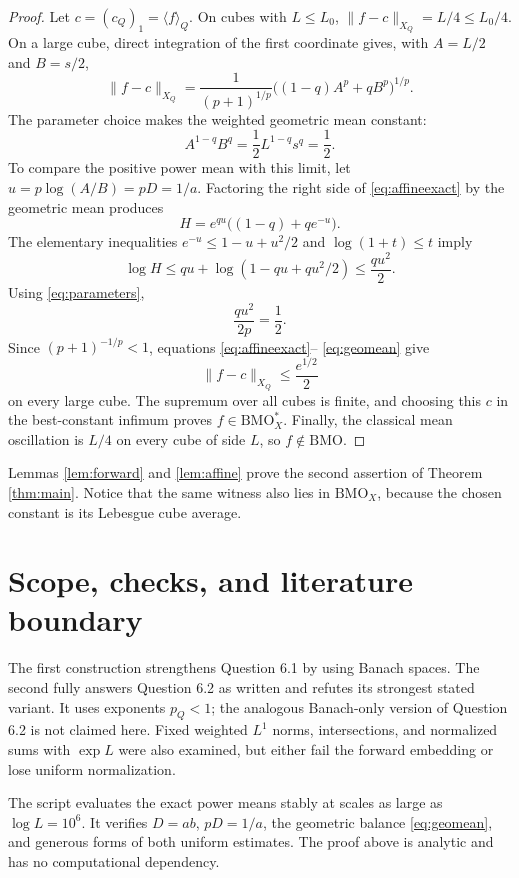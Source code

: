 \documentclass[10pt]{article}
\newcommand{\BMO}{\mathrm{BMO}}
\newcommand{\avg}[1]{\langle #1\rangle}
\begin{document}
\begin{proof}
Let $c=(c_Q)_1=\avg f_Q$.  On cubes with $L\le L_0$,
\(\|f-c\|_{X_Q}=L/4\le L_0/4\).  On a large cube, direct integration of the
first coordinate gives, with $A=L/2$ and $B=s/2$,
\begin{equation}\label{eq:affineexact}
 \|f-c\|_{X_Q}
 =\frac1{(p+1)^{1/p}}
   \bigl((1-q)A^p+qB^p\bigr)^{1/p}.
\end{equation}
The parameter choice makes the weighted geometric mean constant:
\begin{equation}\label{eq:geomean}
 A^{1-q}B^q=\frac12L^{1-q}s^q=\frac12.
\end{equation}
To compare the positive power mean with this limit, let
\(u=p\log(A/B)=pD=1/a\).  Factoring the right side of
\eqref{eq:affineexact} by the geometric mean produces
\[
 H=e^{qu}\bigl((1-q)+qe^{-u}\bigr).
\]
The elementary inequalities $e^{-u}\le1-u+u^2/2$ and
\(\log(1+t)\le t\) imply
\[
 \log H
 \le qu+\log(1-qu+qu^2/2)
 \le\frac{qu^2}{2}.
\]
Using \eqref{eq:parameters},
\[
 \frac{qu^2}{2p}=\frac12.
\]
Since $(p+1)^{-1/p}<1$, equations \eqref{eq:affineexact}--
\eqref{eq:geomean} give
\[
 \|f-c\|_{X_Q}\le\frac{e^{1/2}}2
\]
on every large cube.  The supremum over all cubes is finite, and choosing
this $c$ in the best-constant infimum proves $f\in\BMO_X^*$.  Finally,
the classical mean oscillation is $L/4$ on every cube of side $L$, so
$f\notin\BMO$.
\end{proof}

Lemmas \ref{lem:forward} and \ref{lem:affine} prove the second assertion of
Theorem \ref{thm:main}.  Notice that the same witness also lies in
\(\BMO_X\), because the chosen constant is its Lebesgue cube average.

\section*{Scope, checks, and literature boundary}

The first construction strengthens Question 6.1 by using Banach spaces.  The
second fully answers Question 6.2 as written and refutes its strongest stated
variant.  It uses exponents $p_Q<1$; the analogous Banach-only version of
Question 6.2 is not claimed here.  Fixed weighted $L^1$ norms, intersections,
and normalized sums with \(\exp L\) were also examined, but either fail the
forward embedding or lose uniform normalization.

The script  evaluates the exact power means
stably at scales as large as \(\log L=10^6\).  It verifies
\(D=ab\), $pD=1/a$, the geometric balance \eqref{eq:geomean}, and generous
forms of both uniform estimates.  The proof above is analytic and has no
computational dependency.
\end{document}
